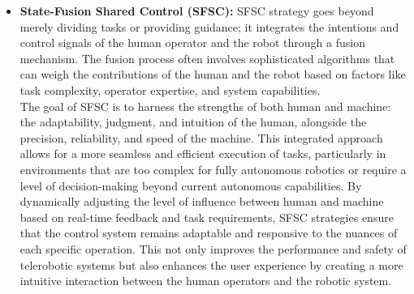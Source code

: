 \begin{itemize}
    \item\textbf{State-Fusion Shared Control (SFSC):} SFSC  strategy goes beyond merely dividing tasks or providing guidance; it integrates the intentions and control signals of the human operator and the robot through a fusion mechanism. The fusion process often involves sophisticated algorithms that can weigh the contributions of the human and the robot based on factors like task complexity, operator expertise, and system capabilities. \\
    The goal of SFSC is to harness the strengths of both human and machine: the adaptability, judgment, and intuition of the human, alongside the precision, reliability, and speed of the machine. This integrated approach allows for a more seamless and efficient execution of tasks, particularly in environments that are too complex for fully autonomous robotics or require a level of decision-making beyond current autonomous capabilities. By dynamically adjusting the level of influence between human and machine based on real-time feedback and task requirements, SFSC strategies ensure that the control system remains adaptable and responsive to the nuances of each specific operation. This not only improves the performance and safety of telerobotic systems but also enhances the user experience by creating a more intuitive interaction between the human operators and the robotic system.

\end{itemize}
